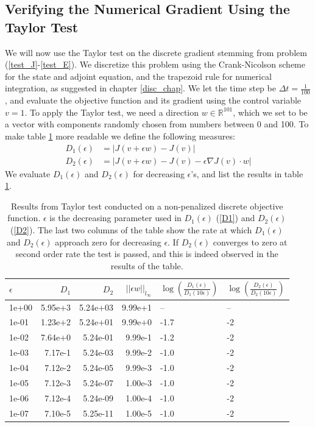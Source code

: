 \subsection{Verifying the Numerical Gradient Using the Taylor Test}
We will now use the Taylor test on the discrete gradient stemming from problem (\ref{test_J}-\ref{test_E}). We discretize this problem using the Crank-Nicolson scheme for the state and adjoint equation, and the trapezoid rule for numerical integration, as suggested in chapter \ref{disc_chap}. We let the time step be $\Delta t=\frac{1}{100}$, and evaluate the objective function and its gradient using the control variable $v=1$. To apply the Taylor test, we need a direction $w\in\mathbb{R}^{101}$, which we set to be a vector with components randomly chosen from numbers between 0 and 100. To make table \ref{Taylor_tab1} more readable we define the following measures:
\begin{align}
D_1(\epsilon) &= |J(v+\epsilon w)-J(v)| \label{D1} \\
D_2(\epsilon) &=|J(v+\epsilon w)-J(v)-\epsilon \nabla J(v)\cdot w|\label{D2}
\end{align} 
We evaluate $D_1(\epsilon)$ and $D_2(\epsilon)$ for decreasing $\epsilon$'s, and list the results in table \ref{Taylor_tab1}.
\\
\begin{table}[h]
\caption{Results from Taylor test conducted on a non-penalized discrete objective function. $\epsilon$ is the decreasing parameter used in $D_1(\epsilon)$ (\ref{D1}) and $D_2(\epsilon)$ (\ref{D2}). The last two columns of the table show the rate at which $D_1(\epsilon)$ and $D_2(\epsilon)$ approach zero for decreasing $\epsilon$. If $D_2(\epsilon)$ converges to zero at second order rate the test is passed, and this is indeed observed in the results of the table. }
\label{Taylor_tab1}
\centering
\begin{tabular}{lrrrll}
\toprule
{} $\epsilon$&  $D_1$ &  $D_2$ &        $||\epsilon w||_{l_{\infty}}$ &    $ \log(\frac{D_1(\epsilon)}{D_1(10\epsilon)})$ &    $ \log(\frac{D_2(\epsilon)}{D_2(10\epsilon)})$ \\
\midrule
1e+00 &  5.95e+3 &        5.24e+03 &  9.99e+1 &       -- &       -- \\
1e-01 &   1.23e+2 &        5.24e+01 &   9.99e+0 &  -1.7 &  -2 \\
1e-02 &     7.64e+0 &        5.24e-01 &   9.99e-1 &  -1.2 &  -2 \\
1e-03 &     7.17e-1 &        5.24e-03 &   9.99e-2 &  -1.0 &  -2 \\
1e-04 &     7.12e-2 &        5.24e-05 &    9.99e-3&  -1.0 &  -2 \\
1e-05 &     7.12e-3 &        5.24e-07 &   1.00e-3 &  -1.0 &  -2 \\
1e-06 &     7.12e-4 &        5.24e-09 &   1.00e-4 &  -1.0 &  -2 \\
1e-07 &     7.10e-5 &        5.25e-11 &   1.00e-5 &  -1.0 &  -2 \\
\bottomrule
\end{tabular}
\end{table}
